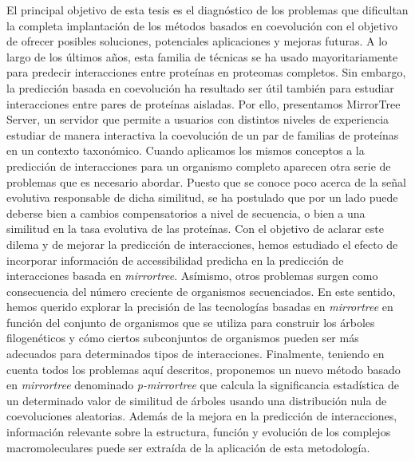 {El principal objetivo de esta tesis es el diagnóstico de los problemas que dificultan la completa implantación de los métodos basados en coevolución con el objetivo de ofrecer posibles soluciones, potenciales aplicaciones y  mejoras futuras. A lo largo de los últimos años, esta familia de técnicas se ha usado mayoritariamente para predecir interacciones entre proteínas en proteomas completos. Sin embargo, la predicción basada en coevolución ha resultado ser útil también para estudiar interacciones entre pares de proteínas aisladas. Por ello, presentamos MirrorTree Server, un servidor que permite a usuarios con distintos niveles de experiencia estudiar de manera interactiva la coevolución de un par de familias de proteínas en un contexto taxonómico. Cuando aplicamos los mismos conceptos a la predicción de interacciones para un organismo completo aparecen otra serie de problemas que es necesario abordar. Puesto que se conoce poco acerca de la señal evolutiva responsable de dicha similitud, se ha postulado que por un lado puede deberse bien a cambios compensatorios a nivel de secuencia, o bien a una similitud en la tasa evolutiva de las proteínas. Con el objetivo de aclarar este dilema y de mejorar la predicción de interacciones, hemos estudiado el efecto de incorporar información de accessibilidad predicha en la predicción de interacciones basada en \emph{mirrortree}. Asímismo, otros problemas surgen como consecuencia del número creciente de organismos secuenciados. En este sentido, hemos querido explorar la precisión de las tecnologías basadas en \emph{mirrortree} en función del conjunto de organismos que se utiliza para construir los árboles filogenéticos y cómo ciertos subconjuntos de organismos pueden ser más adecuados para determinados tipos de interacciones. Finalmente, teniendo en cuenta todos los problemas aquí descritos, proponemos un nuevo método basado en \emph{mirrortree} denominado \emph{p-mirrortree} que calcula la significancia estadística de un determinado valor de similitud de árboles usando una distribución nula de coevoluciones aleatorias. Además de la mejora en la predicción de interacciones, información relevante sobre la estructura, función y evolución de los complejos macromoleculares puede ser extraída de la aplicación de esta metodología. 
}

\cleardoublepage  %

